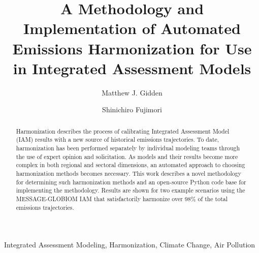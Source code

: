 \begin{frontmatter}

\title{A Methodology and Implementation of Automated Emissions Harmonization for Use in Integrated Assessment Models}

\author[iiasa]{Matthew J. Gidden}

\author[iiasa,nies]{Shinichiro Fujimori}

\address[iiasa]{International Institute for Applied Systems Analysis,
  Schlossplatz 1, A-2361 Laxenburg, Austria}
\address[nies]{National Institute for Environmental Studies, Tsukuba, Japan}

\begin{abstract}
Harmonization describes the process of calibrating Integrated Assessment Model
(IAM) results with a new source of historical emissions trajectories. To date,
harmonization has been performed separately by individual modeling teams through
the use of expert opinion and solicitation. As models and their results become
more complex in both regional and sectoral dimensions, an automated approach to
choosing harmonization methods becomes necessary. This work describes a novel
methodology for determining such harmonization methods and an open-source Python
code base for implementing the methodology. Results are shown for two example
scenarios using the MESSAGE-GLOBIOM IAM that satisfactorily harmonize over 98\%
of the total emissions trajectories. \cite{Dirac1953888}
\end{abstract}

\begin{keyword}
Integrated Assessment Modeling, Harmonization, Climate Change, Air Pollution 
\end{keyword}

\end{frontmatter}

\linenumbers
